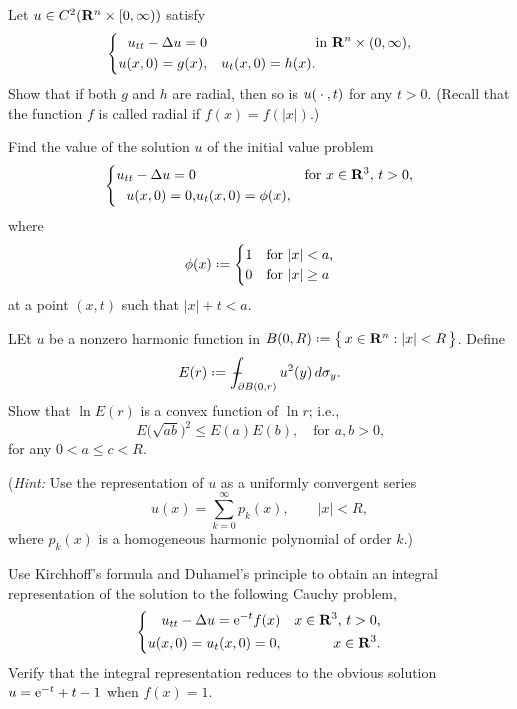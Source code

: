 \begin{problem}
  Let \(u\in C^2(\mathbf{R}^n\times[0,\infty))\) satisfy
  \[
    \left\{
      \begin{aligned}
        u_{tt}-\Delta u=0&&&\text{in \(\mathbf{R}^n\times(0,\infty),\)}\\
        u(x,0)=g(x),&&u_t(x,0)=h(x).
      \end{aligned}
    \right.
  \]
  Show that if both \(g\) and \(h\) are radial, then so is \(u({}\cdot{},t)\)
  for any \(t>0\). (Recall that the function \(f\) is called radial if
  \(f(x)=f(|x|)\).)
\end{problem}
\begin{solution*}
\end{solution*}

\begin{problem}
  Find the value of the solution \(u\) of the initial value problem
  \[
    \left\{
      \begin{aligned}
        u_{tt}-\Lap u=0&&&\text{for \(x\in\R^3\), \(t>0\),}\\
        u(x,0)=0,&u_t(x,0)=\phi(x),
      \end{aligned}
    \right.
  \]
  where
  \[
    \phi(x)\defeq
    \begin{cases}
      1&\text{for \(|x|<a\),}\\
      0&\text{for \(|x|\geq a\)}
    \end{cases}
  \]
  at a point \((x,t)\) such that \(|x|+t<a\).
\end{problem}
\begin{solution*}
\end{solution*}

\begin{problem}
  LEt \(u\) be a nonzero harmonic function in
  \(B(0,R)\defeq\bigl\{\,x\in\R^n:|x|<R\,\bigr\}\). Define
  \[
    E(r)\defeq\fint_{\partial B(0,r)}u^2(y)\diff\sigma_y.
  \]
  Show that \(\ln E(r)\) is a convex function of \(\ln r\); i.e.,
  \[
    E\bigl(\sqrt{ab}\bigr)^2\leq E(a)E(b),\quad\text{for \(a,b>0\),}
  \]
  for any \(0<a\leq c<R\).

  \noindent (\emph{Hint:} Use the representation of \(u\) as a uniformly
  convergent series
  \[
    u(x)=\sum_{k=0}^\infty p_k(x),\qquad |x|<R,
  \]
  where \(p_k(x)\) is a homogeneous harmonic polynomial of order \(k\).)
\end{problem}
\begin{solution*}
\end{solution*}

\begin{problem}
  Use Kirchhoff's formula and Duhamel's principle to obtain an integral
  representation of the solution to the following Cauchy problem,
  \[
    \left\{
      \begin{aligned}
        u_{tt}-\Delta u=\mathrm{e}^{-t}f(x)&&\text{\(x\in\mathbf{R}^3\), \(t>0\),}\\
        u(x,0)=u_t(x,0)=0,&&x\in\mathbf{R}^3.
      \end{aligned}
    \right.
  \]
  Verify that the integral representation reduces to the obvious solution
  \(u=\mathrm{e}^{-t}+t-1\) when \(f(x)=1\).
\end{problem}
\begin{solution*}
\end{solution*}

